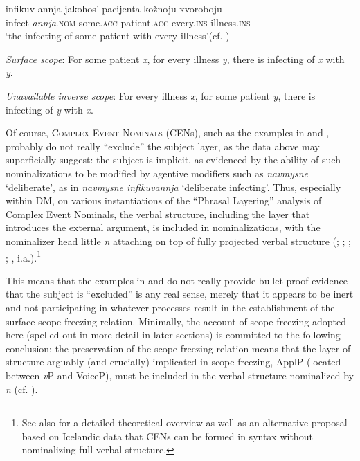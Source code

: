 \documentclass[output=paper,colorlinks,citecolor=brown]{langscibook}
\begin{document}
\ex
\gll    infikuv-annja     jakohos’ pacijenta   kožnoju xvoroboju    \\
infect-\textit{annja}.\textsc{nom}  some.\textsc{acc} patient.\textsc{acc}   every.\textsc{ins} illness.\textsc{ins}\\
\glt `the infecting of some patient with  every illness’\hfill (cf. )

\textit{Surface scope}: For some patient \textit{x}, for every illness \textit{y}, there is infecting of \textit{x} with \textit{y}.

\textit{Unavailable inverse scope}: For every illness \textit{x}, for some patient \textit{y}, there is infecting of  \textit{y} with \textit{x}.
    \z
\z

\noindent Of course, \textsc{Complex Event Nominals} (CENs), such as the examples in  and , probably do not really “exclude” the subject layer, as the data above may superficially suggest: the subject is implicit, as evidenced by the ability of such nominalizations to be modified by agentive modifiers such as \textit{navmysne} ‘deliberate’, as in \textit{navmysne infikuvannja} ‘deliberate infecting’. Thus, especially within DM, on various instantiations of the “Phrasal Layering” analysis of Complex Event Nominals, the verbal structure, including the layer that introduces the external argument, is included in nominalizations, with the nominalizer head little \textit{n} attaching on top of fully projected verbal structure (\citealt{Alexiadou2001,Alexiadou2017a}; \citealt{Bruening2013}; \citealt{Borer2014}; \citealt{Iordachioaia2020}; \citealt{McGinnis2020}, i.a.).\footnote{\textrm{See also \citet{Wood2023} for a detailed theoretical overview as well as an alternative proposal based on Icelandic data that CENs can be formed in syntax without nominalizing full verbal structure.}} 

This means that the examples in  and  do not really provide bullet-proof evidence that the subject is “excluded” is any real sense, merely that it appears to be inert and not participating in whatever processes result in the establishment of the surface scope freezing relation. Minimally, the account of scope freezing adopted here (spelled out in more detail in later sections) is committed to the following conclusion: the preservation of the scope freezing relation means that the layer of structure arguably (and crucially) implicated in scope freezing, \mbox{ApplP} (located between \textit{v}P and VoiceP), must be included in the verbal structure nominalized by \textit{n} (cf. \citealt{Wood2023}).
\end{document}
